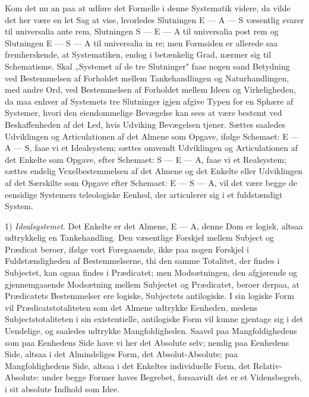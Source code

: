 \documentclass[12pt]{book}
\newcommand{\opage}[1]{\marginnote{\footnotesize\textit{[#1]}}}
\begin{document}
Kom det nu an paa at udføre det Formelle i denne Systematik videre, da vilde det her være en let Sag
at vise, hvorledes Slutningen E --- A --- S væsentlig svarer til universalia ante rem, Slutningen
S --- E --- A til universalia post rem og Slutningen E --- S --- A til universalia in re; men
Formsiden er allerede saa fremherskende, at
\opage{216} Systematiken, endog i betænkelig Grad, nærmer sig til Schematisme. Skal „Systemet af de tre
Slutninger" faae nogen sand Betydning ved Bestemmelsen af Forholdet mellem Tankehandlingen og
Naturhandlingen, med andre Ord, ved Bestemmelsen af Forholdet mellem Ideen og Virkeligheden, da maa
enhver af Systemets tre Slutninger igjen afgive Typen for en Sphære af Systemer, hvori den
eiendommelige Bevægelse kan sees at være bestemt ved Beskaffenheden af det Led, hvis Udviking
Bevægelsen tjener. Sættes saaledes Udviklingen og Articulationen af det Almene som Opgave, ifølge
Schemaet: E --- A --- S, faae vi et Idealsystem; sættes omvendt Udviklingen og Articulationen af det
Enkelte som Opgave, efter Schemaet: S --- E --- A, faae vi et Realsystem; sættes endelig
Vexelbestemmelsen af det Almene og det Enkelte eller Udviklingen af det Særskilte som Opgave efter
Schemaet: E --- S --- A, vil det være begge de eensidige Systemers teleologiske Eenhed, der
articulerer sig i et fuldstændigt System.

1) \emph{Idealsystemet}. Det Enkelte er det Almene, E --- A, denne Dom er logisk, altsaa udtrykkelig
en Tankehandling. Den væsentlige Forskjel mellem Subject og Prædicat beroer, ifølge vort
Foregaaende, ikke paa nogen Forskjel i Fuldstændigheden af Bestemmelserne, thi den samme Totalitet,
der findes i Subjectet, kan ogsaa findes i Prædicatet; men Modsætningen, den afgjørende og
gjennemgaaende Modsætning mellem Subjectet og Prædicatet, beroer derpaa, at Prædicatets
Bestemmelser ere logiske, Subjectets antilogiske. I sin logiske Form vil Prædicatstotaliteten som
det Almene udtrykke Eenheden, medens Subjectstotaliteten i sin existentielle, antilogiske Form vil
kunne gjentage sig i det Uendelige, og saaledes udtrykke Mangfoldigheden. Saavel paa
Mangfoldighedens som paa Eenhedens Side have vi her det Absolute selv; nemlig paa Eenhedens Side,
altsaa i det Almindeliges Form, det Absolut-Absolute; paa Mangfoldighedens Side,
\opage{217} altsaa i det Enkeltes individuelle Form, det Relativ-Absolute: under begge Former haves Begrebet,
forsaavidt det er et Vidensbegreb, i sit absolute Indhold som Idee.
\end{document}
